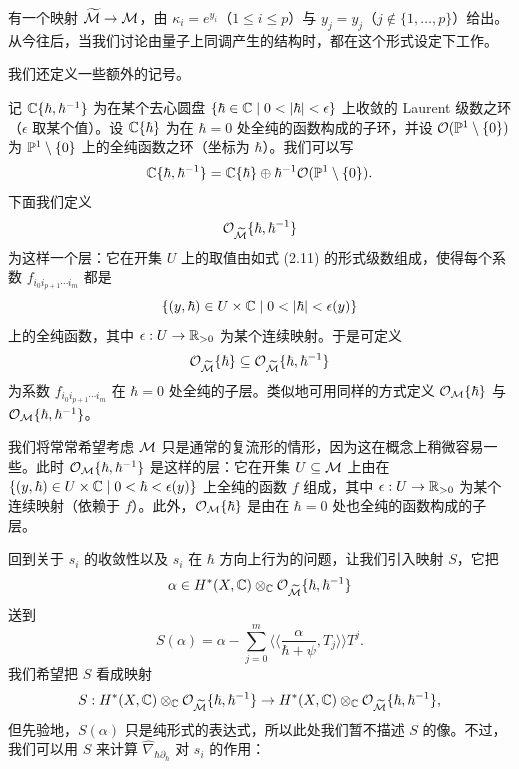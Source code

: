有一个映射 $\widetilde{\mathcal{M}}\to\mathcal{M}$，由 $\kappa_i=e^{y_i}$（$1\le i\le p$）与 $y_j=y_j$（$j\notin\{1,\dots,p\}$）给出。从今往后，当我们讨论由量子上同调产生的结构时，都在这个形式设定下工作。

我们还定义一些额外的记号。


\begin{definition}
记 $\mathbb{C}\{\hbar,\hbar^{-1}\}$ 为在某个去心圆盘 $\{\hbar\in\C\mid0<|\hbar|<\epsilon\}$ 上收敛的 Laurent 级数之环（$\epsilon$ 取某个值）。设 $\mathbb{C}\{\hbar\}$ 为在 $\hbar=0$ 处全纯的函数构成的子环，并设 $\mathcal{O}(\mathbb{P}^1\setminus\{0\})$ 为 $\mathbb{P}^1\setminus\{0\}$ 上的全纯函数之环（坐标为 $\hbar$）。我们可以写
\[
\mathbb{C}\{\hbar,\hbar^{-1}\}=\mathbb{C}\{\hbar\}\oplus\hbar^{-1}\mathcal{O}(\mathbb{P}^1\setminus\{0\}).
\]
下面我们定义
\[
\mathcal{O}_{\widetilde{\mathcal{M}}}\{\hbar,\hbar^{-1}\}
\]
为这样一个层：它在开集 $U$ 上的取值由如式 (2.11) 的形式级数组成，使得每个系数 $f_{i_0i_{p+1}\cdots i_m}$ 都是
\[
\{(y,\hbar)\in U\times\C\mid0<|\hbar|<\epsilon(y)\}
\]
上的全纯函数，其中 $\epsilon:U\to\mathbb{R}_{>0}$ 为某个连续映射。于是可定义
\[
\mathcal{O}_{\widetilde{\mathcal{M}}}\{\hbar\}\subseteq\mathcal{O}_{\widetilde{\mathcal{M}}}\{\hbar,\hbar^{-1}\}
\]
为系数 $f_{i_0i_{p+1}\cdots i_m}$ 在 $\hbar=0$ 处全纯的子层。类似地可用同样的方式定义 $\mathcal{O}_{\mathcal{M}}\{\hbar\}$ 与 $\mathcal{O}_{\mathcal{M}}\{\hbar,\hbar^{-1}\}$。
\end{definition}

我们将常常希望考虑 $\mathcal{M}$ 只是通常的复流形的情形，因为这在概念上稍微容易一些。此时 $\mathcal{O}_{\mathcal{M}}\{\hbar,\hbar^{-1}\}$ 是这样的层：它在开集 $U\subseteq\mathcal{M}$ 上由在 $\{(y,\hbar)\in U\times\mathbb{C}\mid0<\hbar<\epsilon(y)\}$ 上全纯的函数 $f$ 组成，其中 $\epsilon:U\to\mathbb{R}_{>0}$ 为某个连续映射（依赖于 $f$）。此外，$\mathcal{O}_{\mathcal{M}}\{\hbar\}$ 是由在 $\hbar=0$ 处也全纯的函数构成的子层。

回到关于 $s_i$ 的收敛性以及 $s_i$ 在 $\hbar$ 方向上行为的问题，让我们引入映射 $S$，它把
\[
\alpha\in H^*(X,\mathbb{C})\otimes_{\mathbb{C}}\mathcal{O}_{\widetilde{\mathcal{M}}}\{\hbar,\hbar^{-1}\}
\]
送到
\[
S(\alpha)=\alpha-\sum_{j=0}^m\Big\langle\Big\langle\frac{\alpha}{\hbar+\psi},T_j\Big\rangle\Big\rangle T^j.
\]
我们希望把 $S$ 看成映射
\[
S:H^*(X,\mathbb{C})\otimes_{\mathbb{C}}\mathcal{O}_{\widetilde{\mathcal{M}}}\{\hbar,\hbar^{-1}\}\to H^*(X,\mathbb{C})\otimes_{\mathbb{C}}\mathcal{O}_{\widetilde{\mathcal{M}}}\{\hbar,\hbar^{-1}\},
\]
但先验地，$S(\alpha)$ 只是纯形式的表达式，所以此处我们暂不描述 $S$ 的像。不过，我们可以用 $S$ 来计算 $\widehat{\nabla}_{\hbar\partial_\hbar}$ 对 $s_i$ 的作用：

